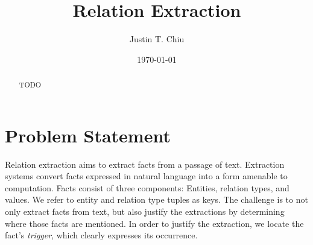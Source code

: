 \documentclass[12pt]{article}
\title{Relation Extraction}
\author{
Justin T. Chiu
}
\date{\today}
\begin{document}
\maketitle

\begin{abstract}
TODO
\end{abstract}

\section{Problem Statement}
\begin{comment}
NOTE on RE vs KBP: KBP focuses on modeling the full database, whereas
in RE the emphasis is on explaining extractions.
KBP usually has a more complicated model over the KB,
while RE sometimes makes simplifying assumptions and could make a poor
KBP system.
Example: if triple double appears in text and someone scored < 10 PTS,
then it's more likely they more likely had > 10 REB.
The difference between RE and KBP is subtle. Both fall under
information extraction, and the models may overlap in many ways.
In fact, latent variable model approaches to RE are usually able to perform KBP as well.
However, the focus is usually not on having good aggregate extraction metrics,
but rather about identifying where facts are in text.
This leads to simplifying assumptions in the model of the KB itself.
On the other hand, KBP moves the difficulty from explaining extractions to
faithfully modeling the KB.
Typically this results in a challenging inference task, as the structure
of the KB may be very complex.
\end{comment}

Relation extraction aims to extract facts from a passage of text.
Extraction systems convert facts expressed in natural language into a form
amenable to computation.
Facts consist of three components: Entities, relation types, and values.
We refer to entity and relation type tuples as keys.
The challenge is to not only extract facts from text, but also
justify the extractions by determining where those facts are mentioned.
In order to justify the extraction, we locate the fact's \textit{trigger},
which clearly expresses its occurrence.

\begin{comment}
(Move or delete later)
A \textit{mention} is a surface realization of an abstract object in text.
In relation extraction we justify extractions by identifying fact mentions.
As text is noisy, the realization of a fact may be difficult to locate.
We focus on locating fact mentions at the word level by identifying
individual words as value mentions, rather than entity or type mentions.
We define a `word-level' decision, value, or process as pertaining to individual words,
while `sequence-level' refers to a single decision, value, or process for a whole sequence.
\end{comment}
\end{document}
